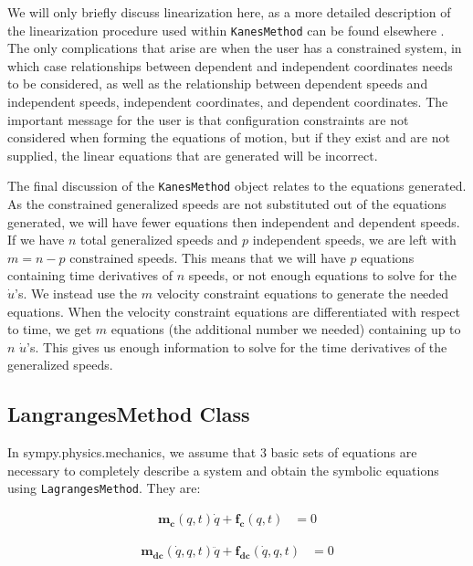 \documentclass[twocolumn,10pt]{asme2e}
\begin{document}
We will only briefly discuss linearization here, as a more detailed description
of the linearization procedure used within \verb|KanesMethod| can be found
elsewhere \cite{Peterson2013}.
The only complications that arise are when the user has a constrained system,
in which case relationships between dependent and independent coordinates needs
to be considered, as well as the relationship between dependent speeds and
independent speeds, independent coordinates, and dependent coordinates.
The important message for the user is that configuration constraints are not
considered when forming the equations of motion, but if they exist and are not
supplied, the linear equations that are generated will be incorrect.

The final discussion of the \verb|KanesMethod| object relates to the equations
generated.
As the constrained generalized speeds are not substituted out of the equations
generated, we will have fewer equations then independent and dependent speeds.
If we have $n$ total generalized speeds and $p$ independent speeds, we are left
with $m=n-p$ constrained speeds.
This means that we will have $p$ equations containing time derivatives of $n$
speeds, or not enough equations to solve for the $\dot{u}$'s.
We instead use the $m$ velocity constraint equations to generate the needed
equations.
When the velocity constraint equations are differentiated with respect to time,
we get $m$ equations (the additional number we needed) containing up to $n$
$\dot{u}$'s.
This gives us enough information to solve for the time derivatives of the
generalized speeds.
\subsection*{LangrangesMethod Class}
In sympy.physics.mechanics, we assume that 3 basic sets of equations are
necessary to completely describe a system and obtain the symbolic equations
using \verb|LagrangesMethod|. They are:

\label{eqn:lag_qd}
\begin{align}
    \mathbf{m_{c}}(q, t) \dot{q} + \mathbf{f_{c}}(q, t) &= 0
\end{align}

\label{eqn:lag_qdd}
\begin{align}
    \mathbf{m_{dc}}(\dot{q}, q, t) \ddot{q} + \mathbf{f_{dc}}(\dot{q}, q,
        t) &= 0
\end{align}
\end{document}
